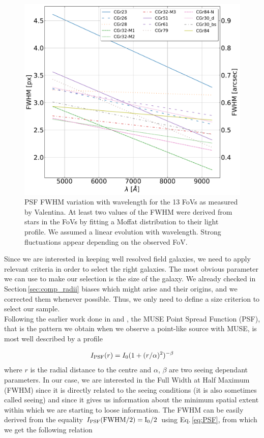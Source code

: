 \begin{figure}[t]
	\centering
	\includegraphics[width=\linewidth]{../Plots/FWHM_variation_with_lambda.pdf}
	\caption[PSF FWHM variation with wavelength.]{PSF FWHM variation with wavelength for the 13 FoVs as measured by Valentina. At least two values of the FWHM were derived from stars in the FoVs by fitting a Moffat distribution to their light profile. We assumed a linear evolution with wavelength. Strong fluctuations appear depending on the observed FoV.}
	\label{fig:FWHM_var_lambda}
\end{figure}

Since we are interested in keeping well resolved field galaxies, we need to apply relevant criteria in order to select the right galaxies. The most obvious parameter we can use to make our selection is the size of the galaxy. We already checked  in Section\,\ref{sec:comp_radii} biases which might arise and their origins, and we corrected them whenever possible. Thus, we only need to define a size criterion to select our sample. \\

Following the earlier work done in  and , the MUSE Point Spread Function (PSF), that is the pattern we obtain when we observe a point-like source with MUSE, is most well described by a  profile

\begin{equation}
	I_{\rm{PSF}}(r) = I_0 (1 + (r/\alpha)^2 ) ^{- \beta}
	\label{eq:PSF}
\end{equation}
where $r$ is the radial distance to the centre and $\alpha$, $\beta$ are two seeing dependant parameters. In our case, we are interested in the Full Width at Half Maximum (FWHM) since it is directly related to the seeing conditions (it is also sometimes called seeing) and since it gives us information about the minimum spatial extent within which we are starting to loose information.
The FWHM can be easily derived from the equality $I_{\rm{PSF}} ( \rm{FWHM}/2) = I_0 /2$ using Eq.\,\ref{eq:PSF}, from which we get the following relation

